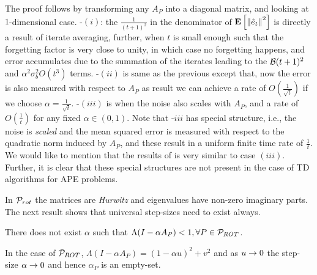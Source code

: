 The proof follows by  transforming any $A_P$ into a diagonal matrix, and looking at $1$-dimensional case. -$(i)$: the $\frac{1}{(t+1)^2}$ in the denominator of $\EE{\norm{\eh_t}^2}$ is directly a result of iterate averaging,  further, when $t$ is small enough such that the forgetting factor is very close to unity, in which case no forgetting happens, and error accumulates due to the summation of the iterates leading to the $\B(t+1)^2$ and $\alpha^2 \sigma_b^2 O(t^3)$ terms. -$(ii)$ is same as the previous except that, now the error is also measured with respect to $A_P$ as result we can achieve a rate of $O(\frac{1}{\sqrt{t}})$ if we choose $\alpha=\frac{1}{\sqrt{t}}$. -$(iii)$ is when the noise also scales with $A_P$, and a rate of $O(\frac{1}{t})$ for any fixed $\alpha\in(0,1)$. Note that -$iii$ has special structure, i.e., the noise is \emph{scaled} and the mean squared error is measured with respect to the quadratic norm induced by $A_P$, and these result in a uniform finite time rate of $\frac{1}{t}$. We would like to mention that the results of \citet{bach} is very similar to case $(iii)$. Further, it is clear that these special structures are not present in the case of TD algorithms for APE problems.

 In $\P_{rot}$ the matrices are \emph{Hurwitz} and eigenvalues have non-zero imaginary parts. The next result shows that universal step-sizes need to exist always.
\begin{proposition}\label{prop:unistep}
There does not exist $\alpha$ such that $\Lambda(I-\alpha A_P)<1, \forall P\in \P_{ROT}$. 
\end{proposition}
In the case of $\P_{ROT}$,  $\Lambda(I-\alpha A_P)=(1-\alpha u)^2+v^2$ and as $u\ra 0$ the step-size $\alpha\ra 0$ and hence $\alpha_P$ is an empty-set.
